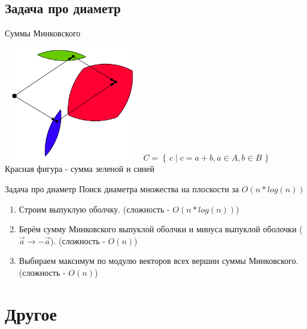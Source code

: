 \documentclass[10pt]{beamer}
\begin{document}
\subsection{Задача про диаметр}
\begin{frame}[fragile]{Суммы Минковского}
\begin{multicols}{2}
\includegraphics[width=6cm, height=5cm]{Term_3/Source/Pictures/minkovskii.png}
\vfill\eject
$C = \left\{\,c \mid c=a+b, a\in A, b\in B\,\right\}$\\
Красная фигура - сумма зеленой и синей
\end{multicols}
\end{frame}

\begin{frame}[fragile]{Задача про диаметр}
Поиск диаметра множества на плоскости за $O(n*log(n))$
\begin{enumerate}
    \item Строим выпуклую оболчку. (сложность - $O(n*log(n))$)
    \item Берём сумму Минковского выпуклой оболчки и минуса выпуклой оболочки ($\vec{a} \rightarrow -\vec{a}$). (сложность - $O(n)$)
    \item Выбираем максимум по модулю векторов всех вершин суммы Минковского. (сложность - $O(n)$)
\end{enumerate}
\end{frame}

\section{Другое}
\end{document}
